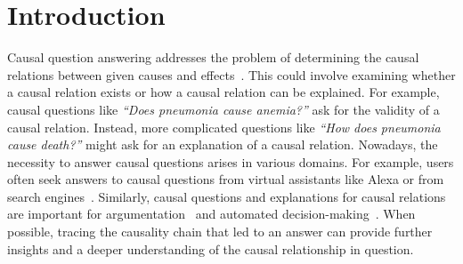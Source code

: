 %
\chapter{Introduction}
\label{ch:introduction}

Causal question answering addresses the problem of determining the causal relations between given causes and effects~\cite{KayeshCausalTransfer2020, DalalCausalQAEnhancing2021}. This could involve examining whether a causal relation exists or how a causal relation can be explained.
For example, causal questions like \textit{``Does pneumonia cause anemia?''} ask for the validity of a causal relation.
Instead, more complicated questions like \textit{``How does pneumonia cause death?''} might ask for an explanation of a causal relation. 
Nowadays, the necessity to answer causal questions arises in various domains. For example, users often seek answers to causal questions from virtual assistants like Alexa or from search engines~\cite{Nguyen2016MSMARCO, Heindorf2020Causenet}. Similarly, causal questions and explanations for causal relations are important for argumentation~\cite{Walton2007Dialog, Habernal2018Argumentation} and automated decision-making~\cite{HassanzadeshCausalQA2019, KayeshCausalTransfer2020, Heindorf2020Causenet}.
When possible, tracing the causality chain that led to an answer can provide further insights and a deeper understanding of the causal relationship in question.




